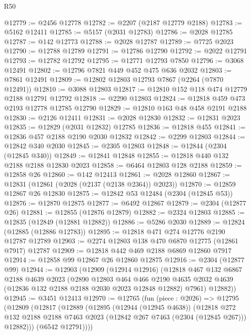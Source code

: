 \begin{lexlean}{R50}
\begin{coremodule}
@12779 := @2456 @12778
@12782 := @2207 (@2187 @12779 @2188)
@12783 := @5162 @12411
@12785 := @5157 (@2031 @12783)
@12786 := @2028 @12785
@12787 := @142 @12773
@12788 := @2028 @12787
@12789 := @7725 @2023
@12790 := @12788 @12789
@12791 := @12786 @12790
@12792 := @2022 @12791
@12793 := @12782 @12792
@12795 := @12771 @12793 @7850
@12796 := @3068 @12491
@12802 := @12796 @7821 @449 @452 @475 @636 @2032
@12803 := @7861 @12491
@12809 := @12802 @12803 @12793 @7867 (@2264 (@7870 @12491))
@12810 := @3088 @12803
@12817 := @12810 @152 @118 @474 @12779 @2188 @12791 @12792
@12818 := @2290 @12803
@12824 := @12818 @459 @473 @2193 @12778 @12785 @12790
@12829 := @12810 @163 @48 @458 @2191 @2188
@12830 := @2126 @12411
@12831 := @2028 @12830
@12832 := @12831 @2023
@12835 := @12829 (@2031 @12832) @12785
@12836 := @12818 @455
@12841 := @12836 @457 @2188 @2190 @2030 @12832
@12842 := @2299 @12803
@12844 := @12842 @340 @2030
@12845 := @2305 @12803
@12848 := @12844 (@2304 (@12845 @340))
@12849 := @12841 @12848
@12855 := @12818 @440 @132 @2188 @2188 @12830 @2023
@12858 := @6464 @12803 @128 @2188
@12859 := @12858 @26
@12860 := @142 @12413
@12861 := @2028 @12860
@12867 := @12831 (@12861 (@2028 (@2137 (@2138 @2364)) @2023))
@12870 := @12859 @12867 @26 @12830
@12875 := @12842 @53 @12484 (@2304 (@12845 @53))
@12876 := @12870 @12875
@12877 := @6492 @12867
@12879 := @2304 (@12877 @26)
@12881 := @12855 (@12876 @12879)
@12882 := @2324 @12803
@12885 := @12835 (@12849 (@12881 @12882))
@12886 := @5286 @2030
@12889 := @12824 (@12885 (@12886 @12783))
@12895 := @12818 @471 @274 @12776 @2190 @12787 @12789
@12903 := @2274 @12803 @138 @470 @6870 @12775 (@12861 @7917) @12787
@12909 := @12818 @442 @469 @2188 @6869 @12860 @7917
@12914 := @12858 @99 @12867 @26 @12860 @12875
@12916 := @2304 (@12877 @99)
@12944 := @12903
    (@12909
      (@12914 @12916)
      (@12818
        @467
        @132
        @6867
        @2188
        @4639
        @2023
        (@2890
          @12803
          @464
          @466
          @2190
          @4635
          @2032
          @4639
          (@12836 @132 @2188 @2188 @2030 @2023 @12848 @12882)
          @7961)
        @12882))
@12945 := @3451 @12413
@12970 := @12765
    (fun (piece : @2026) =>
    @12795
      (@12809
        (@12817
          (@12889
            (@12895
              (@12944 (@12945 @4638))
              (@12818
                @272
                @132
                @2188
                @2188
                @7463
                @2023
                (@12842 @267 @7463 (@2304 (@12845 @267)))
                @12882)))
          (@6542 @12791))))

\end{coremodule}
\end{lexlean}
